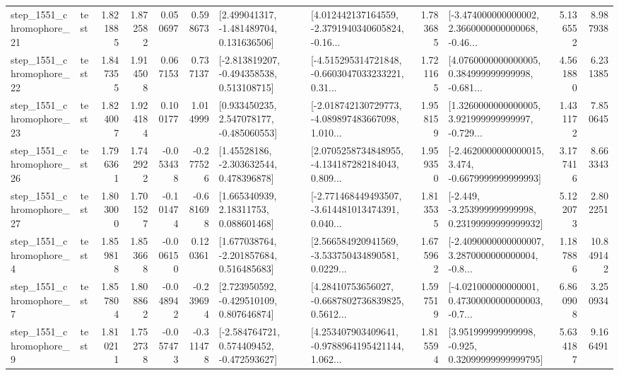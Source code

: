 \begin{tabular}{llrrrrllrlrr}
 step\_1551\_chromophore\_21 &      test &      1.821885 &    1.872582 &      0.050697 &  0.598673 &    [2.499041317, -1.481489704, 0.131636506] &  [4.012442137164559, -2.3791940340605824, -0.16... &       1.783685 &  [-3.474000000000002, 2.3660000000000068, -0.46... &            5.136552 &          8.987938 \\
 step\_1551\_chromophore\_22 &      test &      1.847355 &    1.914508 &      0.067153 &  0.737137 &   [-2.813819207, -0.494358538, 0.513108715] &  [-4.515295314721848, -0.6603047033233221, 0.31... &       1.721165 &  [4.0760000000000005, 0.384999999999998, -0.681... &            4.561880 &          6.231385 \\
 step\_1551\_chromophore\_23 &      test &      1.824007 &    1.924184 &      0.100177 &  1.014999 &    [0.933450235, 2.547078177, -0.485060553] &  [-2.018742130729773, -4.089897483667098, 1.010... &       1.958159 &  [1.3260000000000005, 3.921999999999997, -0.729... &            1.431172 &          7.850645 \\
 step\_1551\_chromophore\_26 &      test &      1.796361 &    1.742922 &     -0.053438 & -0.277526 &     [1.45528186, -2.303632544, 0.478396878] &  [2.0705258734848955, -4.134187282184043, 0.809... &       1.959350 &  [-2.4620000000000015, 3.474, -0.6679999999999993] &            3.177416 &          8.663343 \\
 step\_1551\_chromophore\_27 &      test &      1.803000 &    1.701527 &     -0.101474 & -0.681698 &      [1.665340939, 2.18311753, 0.088601468] &  [-2.771468449493507, -3.614481013474391, 0.040... &       1.813535 &  [-2.449, -3.253999999999998, 0.23199999999999932] &            5.122073 &          2.802251 \\
  step\_1551\_chromophore\_4 &      test &      1.859818 &    1.853668 &     -0.006150 &  0.120361 &    [1.677038764, -2.201857684, 0.516485683] &  [2.566584920941569, -3.533750434890581, 0.0229... &       1.675962 &  [-2.4090000000000007, 3.2870000000000004, -0.8... &            1.187886 &         10.849142 \\
  step\_1551\_chromophore\_7 &      test &      1.857804 &    1.808862 &     -0.048942 & -0.239694 &    [2.723950592, -0.429510109, 0.807646874] &  [4.28410753656027, -0.6687802736839825, 0.5612... &       1.597519 &  [-4.021000000000001, 0.47300000000000003, -0.7... &            6.860908 &          3.250934 \\
  step\_1551\_chromophore\_9 &      test &      1.810211 &    1.752738 &     -0.057473 & -0.311478 &   [-2.584764721, 0.574409452, -0.472593627] &  [4.253407903409641, -0.9788964195421144, 1.062... &       1.815594 &   [3.951999999999998, -0.925, 0.32099999999999795] &            5.634187 &          9.166491 \\

\end{tabular}
